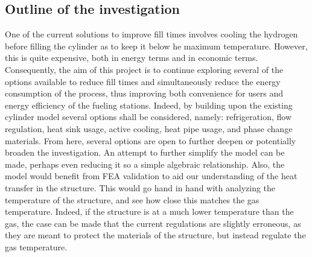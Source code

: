 \subsection{Outline of the investigation}
	One of the current solutions to improve fill times involves cooling the hydrogen before filling the cylinder as to keep it below he maximum temperature. However, this is quite expensive, both in energy terms and in economic terms. Consequently, the aim of this project is to continue exploring several of the options available to reduce fill times and simultaneously reduce the energy consumption of the process, thus improving both convenience for users and energy efficiency of the fueling stations. Indeed, by building upon the existing cylinder model several options shall be considered, namely: refrigeration, flow regulation, heat sink usage, active cooling, heat pipe usage, and phase change materials.  From here, several options are open to further deepen or potentially broaden the investigation. An attempt to further simplify the model can be made, perhaps even reducing it so a simple algebraic relationship. Also, the model would benefit from FEA validation to aid our understanding of the heat transfer in the structure. This would go hand in hand with analyzing the temperature of the structure, and see how close this matches the gas temperature. Indeed, if the structure is at a much lower temperature than the gas, the case can be made that the current regulations are slightly erroneous, as they are meant to protect the materials of the structure, but instead regulate the gas temperature.





